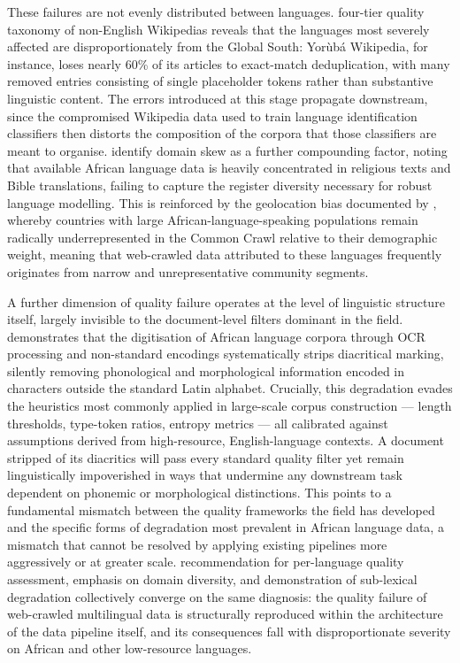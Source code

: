 \documentclass[11pt,a4paper]{article}
\begin{document}
These failures are not evenly distributed between languages. \citet{tatariya2024good} four-tier quality taxonomy of non-English Wikipedias reveals that the languages most severely affected are disproportionately from the Global South: Yorùbá Wikipedia, for instance, loses nearly 60\% of its articles to exact-match deduplication, with many removed entries consisting of single placeholder tokens rather than substantive linguistic content. The errors introduced at this stage propagate downstream, since the compromised Wikipedia data used to train language identification classifiers then distorts the composition of the corpora that those classifiers are meant to organise. \citet{kwon2026afroscope} identify domain skew as a further compounding factor, noting that available African language data is heavily concentrated in religious texts and Bible translations, failing to capture the register diversity necessary for robust language modelling. This is reinforced by the geolocation bias documented by \citet{perelkiewicz2024review}, whereby countries with large African-language-speaking populations remain radically underrepresented in the Common Crawl relative to their demographic weight, meaning that web-crawled data attributed to these languages frequently originates from narrow and unrepresentative community segments.

A further dimension of quality failure operates at the level of linguistic structure itself, largely invisible to the document-level filters dominant in the field. \citet{de2007automatic} demonstrates that the digitisation of African language corpora through OCR processing and non-standard encodings systematically strips diacritical marking, silently removing phonological and morphological information encoded in characters outside the standard Latin alphabet. Crucially, this degradation evades the heuristics most commonly applied in large-scale corpus construction — length thresholds, type-token ratios, entropy metrics — all calibrated against assumptions derived from high-resource, English-language contexts. A document stripped of its diacritics will pass every standard quality filter yet remain linguistically impoverished in ways that undermine any downstream task dependent on phonemic or morphological distinctions. This points to a fundamental mismatch between the quality frameworks the field has developed and the specific forms of degradation most prevalent in African language data, a mismatch that cannot be resolved by applying existing pipelines more aggressively or at greater scale. \citet{tatariya2024good} recommendation for per-language quality assessment, \citet{kwon2026afroscope} emphasis on domain diversity, and \citet{de2007automatic} demonstration of sub-lexical degradation collectively converge on the same diagnosis: the quality failure of web-crawled multilingual data is structurally reproduced within the architecture of the data pipeline itself, and its consequences fall with disproportionate severity on African and other low-resource languages.
\end{document}
